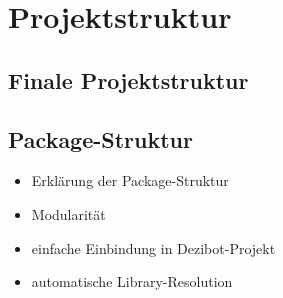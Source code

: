 
\section{Projektstruktur}

\subsection{Finale Projektstruktur}


\subsection{Package-Struktur}

\begin{itemize}
    \item Erklärung der Package-Struktur
    \item Modularität
    \item einfache Einbindung in Dezibot-Projekt
    \item automatische Library-Resolution
\end{itemize}
